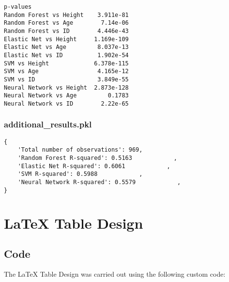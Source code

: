\documentclass[11pt]{article}
\begin{document}
\begin{Verbatim}[tabsize=4]
                            p-values
Random Forest vs Height    3.911e-81
Random Forest vs Age        7.14e-06
Random Forest vs ID        4.446e-43
Elastic Net vs Height     1.169e-109
Elastic Net vs Age         8.037e-13
Elastic Net vs ID          1.902e-54
SVM vs Height             6.378e-115
SVM vs Age                 4.165e-12
SVM vs ID                  3.849e-55
Neural Network vs Height  2.873e-128
Neural Network vs Age         0.1783
Neural Network vs ID        2.22e-65
\end{Verbatim}

\subsubsection*{additional\_results.pkl}

\begin{Verbatim}[tabsize=4]
{
    'Total number of observations': 969,
    'Random Forest R-squared': 0.5163            ,
    'Elastic Net R-squared': 0.6061            ,
    'SVM R-squared': 0.5988            ,
    'Neural Network R-squared': 0.5579            ,
}
\end{Verbatim}

\section{LaTeX Table Design}
\subsection{{Code}}
The LaTeX Table Design was carried out using the following custom code:
\end{document}
